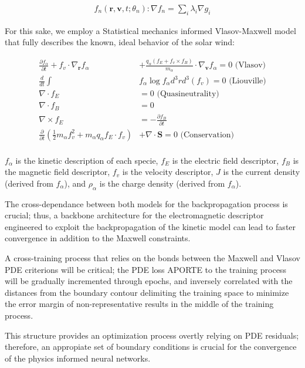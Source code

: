 \documentclass[12pt]{article}
\begin{document}
\begin{align*}
    f_n(\mathbf{r}, \mathbf{v}, t; \theta_n): \nabla f_n = \sum_{i} \lambda_i \nabla g_i
\end{align*}

For this sake, we employ a Statistical mechanics informed Vlasov-Maxwell model that fully describes the known, ideal behavior of the solar wind:

\begin{align*}
    \frac{\partial f_\alpha}{\partial t} + f_v \cdot \nabla_{\mathbf{r}} f_\alpha &+ \frac{q_\alpha ( f_E + f_v \times f_B)}{m_\alpha} \cdot \nabla_{\mathbf{v}} f_\alpha = 0 \text{ (Vlasov)}\\
\frac{d}{dt} \int &f_\alpha \log f_\alpha d^3r d^3(f_v) = 0 \text{ (Liouville)}\\
\nabla \cdot f_E &= 0 \text{ (Quasineutrality)}\\
\nabla \cdot f_B &= 0 \\
\nabla \times f_E &= - \frac{\partial f_B}{\partial t} \\
\frac{\partial}{\partial t} \left( \frac{1}{2} m_\alpha f_v^2 + m_\alpha q_\alpha f_E \cdot f_v \right) &+ \nabla \cdot \textbf{S} = 0 \text{ (Conservation)} \\
\end{align*}

$f_\alpha$ is the kinetic description of each specie, $f_E$ is the electric field descriptor, $f_B$ is the magnetic field descriptor, $f_v$ is the velocity descriptor, $J$ is the current density (derived from $f_\alpha$), and $\rho_\alpha$ is the charge density (derived from $f_\alpha$).

The cross-dependance between both models for the backpropagation process is crucial; thus, a backbone architecture for the electromagnetic descriptor engineered to exploit the backpropagation of the kinetic model can lead to faster convergence in addition to the Maxwell constraints.

A cross-training process that relies on the bonds between the Maxwell and Vlasov PDE criterions will be critical; the PDE loss APORTE to the training process will be gradually incremented through epochs, and inversely correlated with the distances from the boundary contour delimiting the training space to minimize the error margin of non-representative results in the middle of the training process.

This structure provides an optimization process overtly relying on PDE residuals; therefore, an appropiate set of boundary conditions is crucial for the convergence of the physics informed neural networks.
\end{document}
